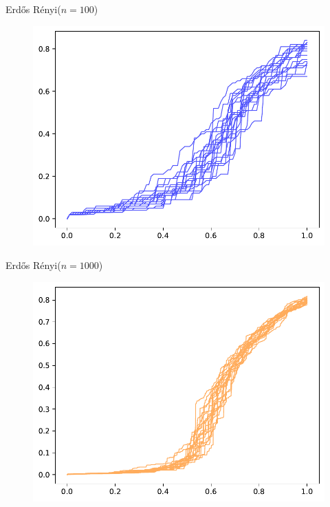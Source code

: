 \documentclass{beamer}
\newcommand{\ER}{Erd\H{o}s R\'enyi\xspace}
\begin{document}
\begin{frame}{\ER ($n =100$)}

        \begin{figure}[H]
                \centering
                \includegraphics[scale=0.7]{fig/100.pdf}
        \end{figure}
\end{frame}
\begin{frame}{\ER ($n =1000$)}

        \begin{figure}[H]
                \centering
                \includegraphics[scale=0.7]{fig/1000.pdf}
        \end{figure}
\end{frame}
\end{document}
